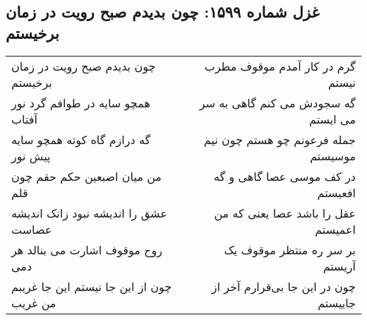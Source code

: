 \begin{center}
\section*{غزل شماره ۱۵۹۹: چون بدیدم صبح رویت در زمان برخیستم}
\label{sec:1599}
\begin{longtable}{l p{0.5cm} r}
چون بدیدم صبح رویت در زمان برخیستم
&&
گرم در کار آمدم موقوف مطرب نیستم
\\
همچو سایه در طوافم گرد نور آفتاب
&&
گه سجودش می کنم گاهی به سر می ایستم
\\
گه درازم گاه کوته همچو سایه پیش نور
&&
جمله فرعونم چو هستم چون نیم موسیستم
\\
من میان اصبعین حکم حقم چون قلم
&&
در کف موسی عصا گاهی و گه افعیستم
\\
عشق را اندیشه نبود زانک اندیشه عصاست
&&
عقل را باشد عصا یعنی که من اعمیستم
\\
روح موقوف اشارت می بنالد هر دمی
&&
بر سر ره منتظر موقوف یک آریستم
\\
چون از این جا نیستم این جا غریبم من غریب
&&
چون در این جا بی‌قرارم آخر از جاییستم
\\
\end{longtable}
\end{center}

